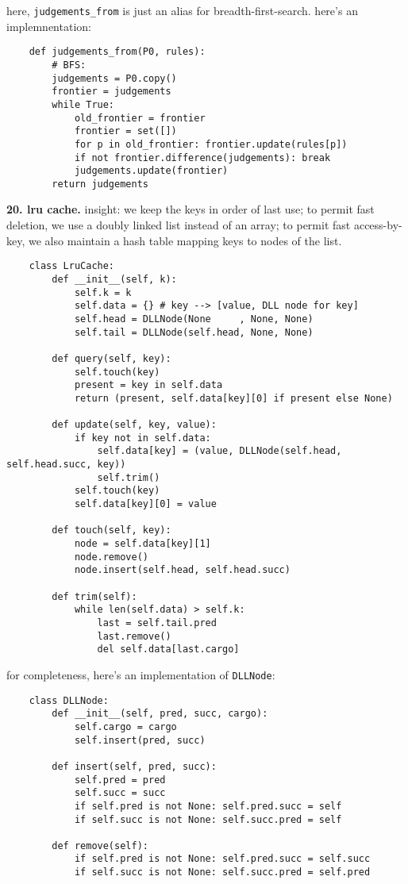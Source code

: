 \documentclass{article}
\newcommand{\cd}{\texttt}
\begin{document}
\vfill
\noindent here, \cd{judgements\_from} is just an alias for
breadth-first-search.  here's an implemnentation:
\begin{verbatim}
    def judgements_from(P0, rules):
        # BFS: 
        judgements = P0.copy()
        frontier = judgements
        while True:
            old_frontier = frontier
            frontier = set([])
            for p in old_frontier: frontier.update(rules[p]) 
            if not frontier.difference(judgements): break
            judgements.update(frontier)
        return judgements 
\end{verbatim}

\newpage
    \par\noindent\hspace{-1cm}
    \textbf{20. lru cache.}
        insight: we keep the keys in order of last use; to permit fast
                 deletion, we use a doubly linked list instead of an array;
                 to permit fast access-by-key, we also maintain a hash
                 table mapping keys to nodes of the list.
\begin{verbatim}
    class LruCache:
        def __init__(self, k):
            self.k = k
            self.data = {} # key --> [value, DLL node for key]
            self.head = DLLNode(None     , None, None) 
            self.tail = DLLNode(self.head, None, None)

        def query(self, key): 
            self.touch(key)
            present = key in self.data
            return (present, self.data[key][0] if present else None) 

        def update(self, key, value): 
            if key not in self.data:
                self.data[key] = (value, DLLNode(self.head, self.head.succ, key)) 
                self.trim()
            self.touch(key)
            self.data[key][0] = value

        def touch(self, key):
            node = self.data[key][1] 
            node.remove()
            node.insert(self.head, self.head.succ)

        def trim(self):
            while len(self.data) > self.k:
                last = self.tail.pred
                last.remove()
                del self.data[last.cargo] 
\end{verbatim}

\vfill
\noindent for completeness, here's an implementation of \cd{DLLNode}: 
\begin{verbatim}
    class DLLNode:
        def __init__(self, pred, succ, cargo):  
            self.cargo = cargo
            self.insert(pred, succ)

        def insert(self, pred, succ):
            self.pred = pred
            self.succ = succ
            if self.pred is not None: self.pred.succ = self
            if self.succ is not None: self.succ.pred = self

        def remove(self): 
            if self.pred is not None: self.pred.succ = self.succ
            if self.succ is not None: self.succ.pred = self.pred
\end{verbatim}
\end{document}
